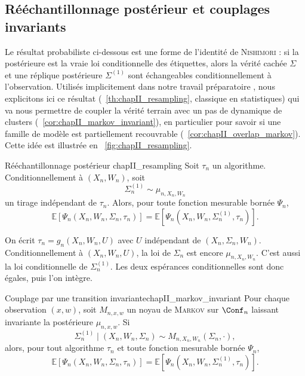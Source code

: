 \subsection{Rééchantillonnage postérieur et couplages invariants}
\label{sec:chapII_couplage}

Le résultat probabiliste ci-dessous est une forme de l'identité de \textsc{Nishimori} \cite{Nishimori1980,Nishimori2001} : si la postérieure est la vraie loi conditionnelle des étiquettes, alors la vérité cachée $\Sigma$ et une réplique postérieure $\Sigma^{(1)}$ sont échangeables conditionnellement à l'observation. 
Utilisés implicitement dans notre travail préparatoire \cite{BibiMonterey}, nous explicitons ici ce résultat (\Th~\ref{th:chapII_resampling}, classique en statistiques) qui va nous permettre de coupler la vérité terrain avec un pas de dynamique de clusters (\Cor~\ref{cor:chapII_markov_invariant}), en particulier pour savoir si une famille de modèle est partiellement recouvrable (\Cor~\ref{cor:chapII_overlap_markov}).
Cette idée est illustrée en \Fig~\ref{fig:chapII_resampling}.

\begin{Theoreme}{Rééchantillonnage postérieur \cite{Nishimori1980,Nishimori2001}}{chapII_resampling}
Soit $\tau_n$ un algorithme. Conditionnellement à $(X_n,W_n)$, soit
\[
    \Sigma_n^{(1)}\sim\mu_{n,X_n,W_n}
\]
un tirage indépendant de $\tau_n$. Alors, pour toute fonction mesurable bornée $\Psi_n$,
\begin{equation}
    \mathbb E\left[\Psi_n(X_n,W_n,\Sigma_n,\tau_n)\right]
    =
    \mathbb E\left[\Psi_n(X_n,W_n,\Sigma_n^{(1)},\tau_n)\right].
    \label{eq:chapII_resampling}
\end{equation}
\end{Theoreme}

\begin{Preuve}
On écrit $\tau_n=g_n(X_n,W_n,U)$ avec $U$ indépendant de $(X_n,\Sigma_n,W_n)$. Conditionnellement à $(X_n,W_n,U)$, la loi de $\Sigma_n$ est encore $\mu_{n,X_n,W_n}$. C'est aussi la loi conditionnelle de $\Sigma_n^{(1)}$. Les deux espérances conditionnelles sont donc égales, puis l'on intègre.
\end{Preuve}

\begin{Corollaire}{Couplage par une transition invariante}{chapII_markov_invariant}
Pour chaque observation $(x,w)$, soit $M_{n,x,w}$ un noyau de \textsc{Markov} sur $\Conf_n$ laissant invariante la postérieure $\mu_{n,x,w}$. Si
\[
    \Sigma_n^{(1)}\mid (X_n,W_n,\Sigma_n)
    \sim
    M_{n,X_n,W_n}(\Sigma_n,\cdot),
\]
alors, pour tout algorithme $\tau_n$ et toute fonction mesurable bornée $\Psi_n$,
\begin{equation}
    \mathbb E\left[\Psi_n(X_n,W_n,\Sigma_n,\tau_n)\right]
    =
    \mathbb E\left[\Psi_n(X_n,W_n,\Sigma_n^{(1)},\tau_n)\right].
    \label{eq:chapII_markov_coupling}
\end{equation}
\end{Corollaire}

